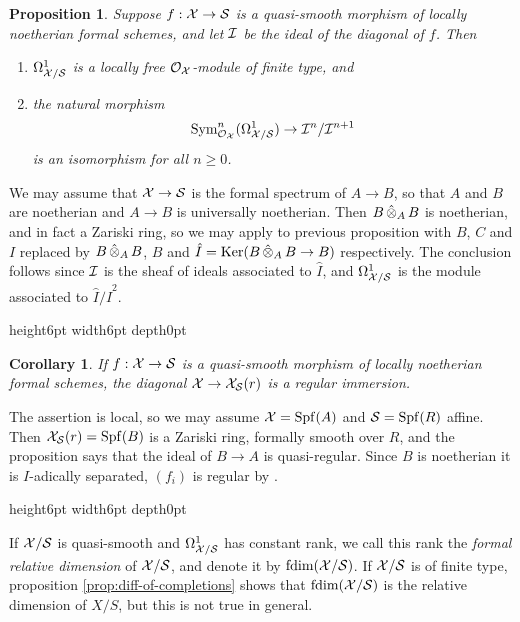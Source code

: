 \documentclass{article}
\theoremstyle{change}
\newtheorem{prop}[subsubsection]{Proposition}
\newtheorem{cor}[subsubsection]{Corollary}
\numberwithin{equation}{subsubsection}
\newcommand{\demobox}{\vrule height6pt width6pt depth0pt}
\newenvironment{demo}{\noindent{\it Proof.}}
{{\unskip\nobreak\hfil\qquad
\demobox\parfillskip=0pt\par}
\medskip}
\newcommand\hI{\hat I}
\begin{document}
\begin{prop}\label{prop:formally-smooth-and-diff-smooth-formal-case}
  Suppose $f:{\cal X}\to{\cal S}$ is a quasi-smooth morphism of locally noetherian
  formal schemes, and let ${\cal I}$ be the ideal of the diagonal of
  $f$. Then
  \begin{enumerate}
  \item $\Omega^1_{{\cal X}/{\cal S}}$ is a locally free ${\cal O}_{\cal X}$-module of finite
    type, and
  \item the natural morphism
    \begin{displaymath}
      {\textrm{Sym}}^n_{{\cal O}_{\cal X}}(\Omega^1_{{\cal X}/{\cal S}})\to{\cal I}^n/{\cal I}^{n+1}
    \end{displaymath}
    is an isomorphism for all $n\ge0$.
  \end{enumerate}
\end{prop}
\begin{demo}
  We may assume that ${\cal X}\to{\cal S}$ is the formal spectrum of $A\to B$,
  so that $A$ and $B$ are noetherian and $A\to B$ is universally
  noetherian. Then $B\mathop{\hat\otimes}_AB$ is noetherian, and in fact a Zariski
  ring, so we may apply to previous proposition with $B$, $C$ and $I$
  replaced by $B\mathop{\hat\otimes}_AB$, $B$ and $\hI=\Ker(B\ctens_AB\to B)$
  respectively. The conclusion follows since ${\cal I}$ is the sheaf of
  ideals associated to $\hI$, and $\Omega^1_{{\cal X}/{\cal S}}$ is the module
  associated to $\hI/\hI^2$.
\end{demo}

\begin{cor}\label{cor:smooth-implies-regular-diagonal}
  If $f:{\cal X}\to{\cal S}$ is a quasi-smooth morphism of locally noetherian
  formal schemes, the diagonal ${\cal X}\to{\cal X}_{\cal S}(r)$ is a regular
  immersion.   
\end{cor}
\begin{demo}
  The assertion is local, so we may assume ${\cal X}={\operatorname{Spf}({A})}$ and
  ${\cal S}={\operatorname{Spf}({R})}$ affine. Then ${\cal X}_{\cal S}(r)={\operatorname{Spf}({B})}$ is a Zariski ring,
  formally smooth over $R$, and the proposition says that the ideal of
  $B\to A$ is quasi-regular. Since $B$ is noetherian it is
  $I$-adically separated, $(f_i)$ is regular by \cite[15.1.9]{EGA}.
\end{demo}

If ${\cal X}/{\cal S}$ is quasi-smooth and $\Omega^1_{{\cal X}/{\cal S}}$ has constant rank, we
call this rank the \textit{formal relative dimension} of ${\cal X}/{\cal S}$,
and denote it by $\mathop{\textrm{fdim}({{\cal X}/{\cal S}})}$. If ${\cal X}/{\cal S}$ is of finite type,
proposition \ref{prop:diff-of-completions} shows that $\mathop{\textrm{fdim}({{\cal X}/{\cal S}})}$
is the relative dimension of $X/S$, but this is not true in general.
\end{document}
